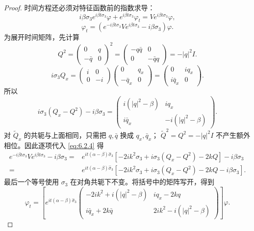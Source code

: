 \documentclass[lang=cn,scheme=chinese,mode=simple,device=normal,color=blue,
math=cm,thmcnt=section,12pt]{elegantbook}
\newcommand{\eqq}[2]{\tag{#1}\label{eq:#1}#2}
\begin{document}
\begin{proof}
    时间方程还必须对特征函数前的指数求导：
    \[
        i\beta\sigma_3e^{i\beta t\sigma_3}\varphi
        +e^{i\beta t\sigma_3}\varphi_t=Ve^{i\beta t\sigma_3}\varphi,
    \]
    \[
        \varphi_t=(e^{-i\beta t\sigma_3}Ve^{i\beta t\sigma_3}-i\beta\sigma_3)\varphi.
    \]
    为展开时间矩阵，先计算
    \[
        Q^2=\begin{pmatrix}0&q\\-\bar q&0\end{pmatrix}^2
        =\begin{pmatrix}-q\bar q&0\\0&-\bar q q\end{pmatrix}=-|q|^2I.
    \]
    \[
        i\sigma_3Q_x=
        \begin{pmatrix}i&0\\0&-i\end{pmatrix}
        \begin{pmatrix}0&q_x\\-\bar q_x&0\end{pmatrix}
        =\begin{pmatrix}0&iq_x\\i\bar q_x&0\end{pmatrix}.
    \]
    所以
    \[
        i\sigma_3(Q_x-Q^2)-i\beta\sigma_3
        =\begin{pmatrix}i(|q|^2-\beta)&iq_x\\i\bar q_x&-i(|q|^2-\beta)\end{pmatrix}.
    \]
    对 $\widetilde Q_x$ 的共轭与上面相同，只需把 $q,\bar q$ 换成 $q_x,\bar q_x$；
    $\widetilde Q^2=Q^2=-|q|^2I$ 不产生额外相位。因此逐项代入 \eqref{eq:6.2.4} 得
    \[
        \begin{aligned}
            e^{-i\beta t\sigma_3}Ve^{i\beta t\sigma_3}-i\beta\sigma_3
            ={} & e^{it(\alpha-\beta)\widehat\sigma_3}
            [-2ik^2\sigma_3+i\sigma_3(Q_x-Q^2)-2kQ]-i\beta\sigma_3 \\
            ={} & e^{it(\alpha-\beta)\widehat\sigma_3}
                [-2ik^2\sigma_3+i\sigma_3(Q_x-Q^2)-2kQ-i\beta\sigma_3].
        \end{aligned}
    \]
    最后一个等号使用 $\sigma_3$ 在对角共轭下不变。将括号中的矩阵写开，得到
    \begin{equation}
        \eqq{6.2.12}{\varphi_t=\left[e^{it(\alpha-\beta)\widehat\sigma_3}
                \begin{pmatrix}-2ik^2+i(|q|^2-\beta)&iq_x-2kq\\i\bar q_x+2k\bar q&2ik^2-i(|q|^2-\beta)\end{pmatrix}\right]\varphi.}

\end{equation}
\end{proof}
\end{document}
